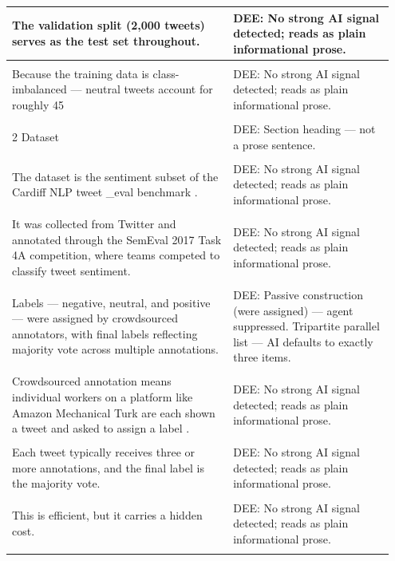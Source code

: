 \documentclass[11pt]{article}
\begin{document}
\begin{longtable}{|p{0.55\linewidth}|p{0.40\linewidth}|}
\hline
The validation split (2,000 tweets) serves as the test set throughout. & DEE: No strong AI signal detected; reads as plain informational prose. \\[2pt]
\hline
\rule{0pt}{3.5cm} & \\
\hline
Because the training data is class-imbalanced --- neutral tweets account for roughly 45 & DEE: No strong AI signal detected; reads as plain informational prose. \\[2pt]
\hline
\rule{0pt}{3.5cm} & \\
\hline
2 Dataset & DEE: Section heading --- not a prose sentence. \\[2pt]
\hline
\rule{0pt}{3.5cm} & \\
\hline
The dataset is the sentiment subset of the Cardiff NLP tweet \_eval benchmark . & DEE: No strong AI signal detected; reads as plain informational prose. \\[2pt]
\hline
\rule{0pt}{3.5cm} & \\
\hline
It was collected from Twitter and annotated through the SemEval 2017 Task 4A competition, where teams competed to classify tweet sentiment. & DEE: No strong AI signal detected; reads as plain informational prose. \\[2pt]
\hline
\rule{0pt}{3.5cm} & \\
\hline
Labels --- negative, neutral, and positive --- were assigned by crowdsourced annotators, with final labels reflecting majority vote across multiple annotations. & DEE: Passive construction (were assigned) --- agent suppressed. Tripartite parallel list --- AI defaults to exactly three items. \\[2pt]
\hline
\rule{0pt}{3.5cm} & \\
\hline
Crowdsourced annotation means individual workers on a platform like Amazon Mechanical Turk are each shown a tweet and asked to assign a label . & DEE: No strong AI signal detected; reads as plain informational prose. \\[2pt]
\hline
\rule{0pt}{3.5cm} & \\
\hline
Each tweet typically receives three or more annotations, and the final label is the majority vote. & DEE: No strong AI signal detected; reads as plain informational prose. \\[2pt]
\hline
\rule{0pt}{3.5cm} & \\
\hline
This is efficient, but it carries a hidden cost. & DEE: No strong AI signal detected; reads as plain informational prose. \\[2pt]
\hline
\rule{0pt}{3.5cm} & \\

\end{longtable}
\end{document}
